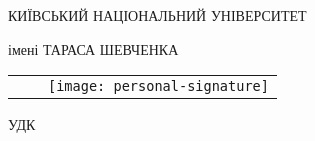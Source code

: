 \thispagestyle{empty}
\begin{center}%
\MakeUppercase{\thesisMON}

\vspace{0.5cm}
\MakeUppercase{Київський національний університет}

імені \MakeUppercase{Тараса Шевченка}

\end{center}%


\vspace{0pt plus1fill}
\noindent%
\begin{tabularx}{\textwidth}{@{}lXr@{}}%
    & & \texttt{[image: personal-signature]}  %
    \\
\end{tabularx}


\vspace{0pt plus-1.5fill} %
\begin{center}
\textbf {\MakeUppercase{ \thesisAuthor}}
\end{center}

\vspace{0pt plus0.1fill} %
\begin{flushright}%
  \begin{minipage}[b]{0.45\linewidth}
    \begin{flushleft}%
       УДК \thesisUdk
    \end{flushleft}%
  \end{minipage}
\end{flushright}%

